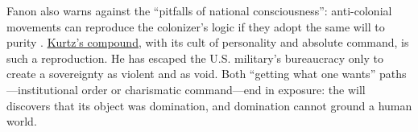 Fanon also warns against the ``pitfalls of national consciousness'': anti-colonial movements
can reproduce the colonizer's logic if they adopt the same will to purity
\parencite{FanonWretched2004}. \hyperref[scene:kurtz-compound]{Kurtz's compound}, with its
cult of personality and absolute command, is such a reproduction. He has escaped the U.S.
military's bureaucracy only to create a sovereignty as violent and as void. Both ``getting
what one wants'' paths---institutional order or charismatic command---end in exposure: the
will discovers that its object was
domination, and domination cannot ground a human world.
